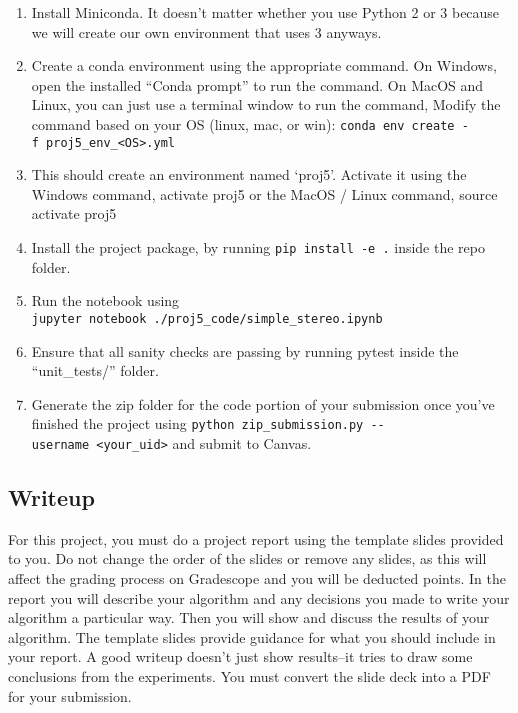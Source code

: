 \documentclass[
  letterpaper,
  DIV=11,
  numbers=noendperiod]{scrartcl}
\providecommand{\tightlist}{%
  \setlength{\itemsep}{0pt}\setlength{\parskip}{0pt}}\usepackage{longtable,booktabs,array}
\begin{document}
\begin{enumerate}
\def\labelenumi{\arabic{enumi}.}
\tightlist
\item
  Install Miniconda. It doesn't matter whether you use Python 2 or 3
  because we will create our own environment that uses 3 anyways.
\item
  Create a conda environment using the appropriate command. On Windows,
  open the installed ``Conda prompt'' to run the command. On MacOS and
  Linux, you can just use a terminal window to run the command, Modify
  the command based on your OS (linux, mac, or win):
  \texttt{conda\ env\ create\ -f\ proj5\_env\_\textless{}OS\textgreater{}.yml}
\item
  This should create an environment named `proj5'. Activate it using the
  Windows command, activate proj5 or the MacOS / Linux command, source
  activate proj5
\item
  Install the project package, by running \texttt{pip\ install\ -e\ .}
  inside the repo folder.
\item
  Run the notebook using
  \texttt{jupyter\ notebook\ ./proj5\_code/simple\_stereo.ipynb}
\item
  Ensure that all sanity checks are passing by running pytest inside the
  ``unit\_tests/'' folder.
\item
  Generate the zip folder for the code portion of your submission once
  you've finished the project using
  \texttt{python\ zip\_submission.py\ -\/-username\ \textless{}your\_uid\textgreater{}}
  and submit to Canvas.
\end{enumerate}

\hypertarget{writeup}{%
\subsection{Writeup}\label{writeup}}

For this project, you must do a project report using the template slides
provided to you. Do not change the order of the slides or remove any
slides, as this will affect the grading process on Gradescope and you
will be deducted points. In the report you will describe your algorithm
and any decisions you made to write your algorithm a particular way.
Then you will show and discuss the results of your algorithm. The
template slides provide guidance for what you should include in your
report. A good writeup doesn't just show results--it tries to draw some
conclusions from the experiments. You must convert the slide deck into a
PDF for your submission.
\end{document}
